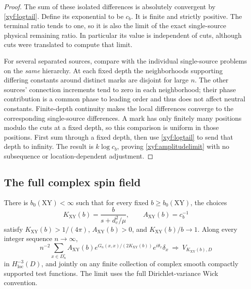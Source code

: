 \begin{proof}
The sum of these isolated differences is absolutely convergent by
\eqref{xyf:logtail}.  Define its exponential to be \(c_b\).
It is finite and strictly positive.  The terminal ratio tends to
one, so it is also the limit of the exact single-source physical
remaining ratio.  In particular its value is independent of cuts,
although cuts were translated to compute that limit.

For several separated sources, compare with the individual
single-source problems on the \emph{same} hierarchy.  At each fixed
depth the neighborhoods supporting differing constants around
distinct marks are disjoint for large \(n\).  The other sources'
connection increments tend to zero in each neighborhood; their
phase contribution is a common phase to leading order and thus
does not affect neutral constants.  Finite-depth continuity makes
the local differences converge to the corresponding single-source
differences.  A mark has only finitely many positions modulo the
cuts at a fixed depth, so this comparison is uniform in those
positions.  First sum through a fixed depth, then use
\eqref{xyf:logtail} to send that depth to infinity.  The result is
\(k\log c_b\), proving \eqref{xyf:amplitudelimit} with no
subsequence or location-dependent adjustment.
\end{proof}

\subsection{The full complex spin field}

\begin{theorem}\label{xyf:spin}
There is \(b_0(\mathrm{XY})<\infty\) such that for every fixed
\(b\ge b_0(\mathrm{XY})\), the choices
\begin{equation}
 K_{\mathrm{XY}}(b)=\frac{b}{s+d_c^2/\mu},
 \qquad A_{\mathrm{XY}}(b)=c_b^{-1}
 \label{xyf:stiffness}
\end{equation}
satisfy \(K_{\mathrm{XY}}(b)>1/(4\pi)\),
\(A_{\mathrm{XY}}(b)>0\), and \(K_{\mathrm{XY}}(b)/b\to1\).
Along every integer sequence \(n\to\infty\),
\[
 n^{-2}\sum_{x\in D_n^\circ}
  A_{\mathrm{XY}}(b)e^{G_n(x,x)/(2K_{\mathrm{XY}}(b))}
       e^{i\theta_x}\delta_x
       \ \Longrightarrow\ V_{K_{\mathrm{XY}}(b),D}
\]
in \(H^{-3}_{\mathrm{loc}}(D)\), and jointly on any finite
collection of complex smooth compactly supported test functions.
The limit uses the full Dirichlet-variance Wick convention.
\end{theorem}

